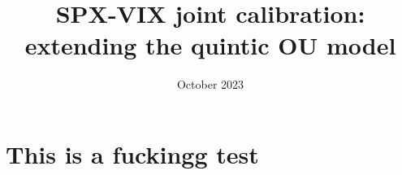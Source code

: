 \documentclass[a4paper, 12pt]{article}
\title{SPX-VIX joint calibration: extending the quintic OU model}
\author{}
\date{October 2023}
\begin{document}
\maketitle

\section{This is a fuckingg test}
\end{document}
